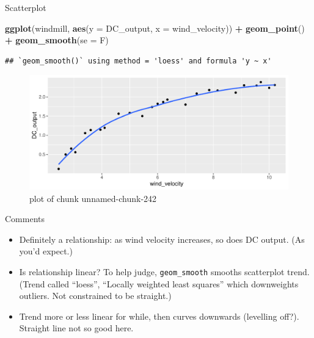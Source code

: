\documentclass[ignorenonframetext,]{beamer}
\newenvironment{Shaded}{\begin{snugshade}}{\end{snugshade}}
\newcommand{\DataTypeTok}[1]{\textcolor[rgb]{0.13,0.29,0.53}{#1}}
\newcommand{\KeywordTok}[1]{\textcolor[rgb]{0.13,0.29,0.53}{\textbf{#1}}}
\newcommand{\NormalTok}[1]{#1}
\newcommand{\OperatorTok}[1]{\textcolor[rgb]{0.81,0.36,0.00}{\textbf{#1}}}
\newcommand{\StringTok}[1]{\textcolor[rgb]{0.31,0.60,0.02}{#1}}
\providecommand{\tightlist}{%
  \setlength{\itemsep}{0pt}\setlength{\parskip}{0pt}}
\begin{document}
\begin{frame}[fragile]{Scatterplot}
\protect\hypertarget{scatterplot}{}

\begin{Shaded}
\begin{Highlighting}[]
\KeywordTok{ggplot}\NormalTok{(windmill, }\KeywordTok{aes}\NormalTok{(}\DataTypeTok{y =}\NormalTok{ DC_output, }\DataTypeTok{x =}\NormalTok{ wind_velocity)) }\OperatorTok{+}
\StringTok{  }\KeywordTok{geom_point}\NormalTok{() }\OperatorTok{+}\StringTok{ }\KeywordTok{geom_smooth}\NormalTok{(}\DataTypeTok{se =}\NormalTok{ F)}
\end{Highlighting}
\end{Shaded}

\begin{verbatim}
## `geom_smooth()` using method = 'loess' and formula 'y ~ x'
\end{verbatim}

\begin{figure}
\centering
\includegraphics{figure/unnamed-chunk-242-1.pdf}
\caption{plot of chunk unnamed-chunk-242}
\end{figure}

\end{frame}

\begin{frame}[fragile]{Comments}
\protect\hypertarget{comments-12}{}

\begin{itemize}
\tightlist
\item
  Definitely a relationship: as wind velocity increases, so does DC
  output. (As you'd expect.)
\item
  Is relationship linear? To help judge, \texttt{geom\_smooth} smooths
  scatterplot trend. (Trend called ``loess'', ``Locally weighted least
  squares'' which downweights outliers. Not constrained to be straight.)
\item
  Trend more or less linear for while, then curves downwards (levelling
  off?). Straight line not so good here.
\end{itemize}

\end{frame}
\end{document}

